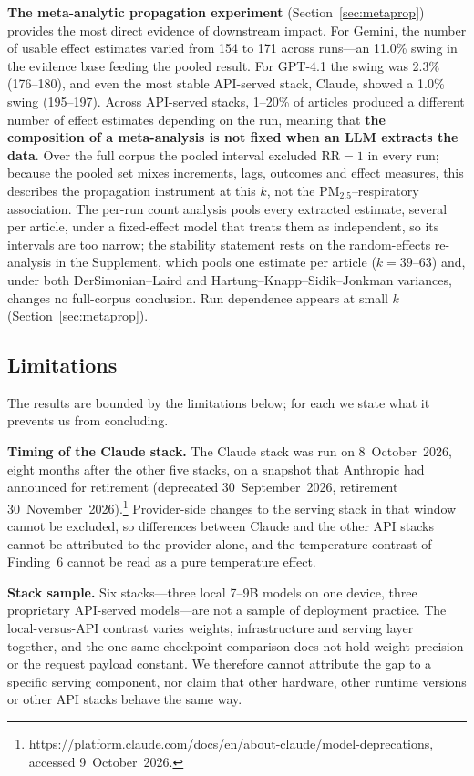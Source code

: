 \documentclass[preprint,review,12pt,authoryear]{elsarticle}
\begin{document}
\textbf{The meta-analytic propagation experiment} (Section~\ref{sec:metaprop}) provides the most direct evidence of downstream impact.
For Gemini, the number of usable effect estimates varied from 154 to 171 across runs---an 11.0\% swing in the evidence base feeding the pooled result.
For GPT-4.1 the swing was 2.3\% (176--180), and even the most stable API-served stack, Claude, showed a 1.0\% swing (195--197).
Across API-served stacks, 1--20\% of articles produced a different number of effect estimates depending on the run, meaning that \textbf{the composition of a meta-analysis is not fixed when an LLM extracts the data}.
Over the full corpus the pooled interval excluded RR${=}1$ in every run; because the pooled set mixes increments, lags, outcomes and effect measures, this describes the propagation instrument at this $k$, not the PM$_{2.5}$--respiratory association. The per-run count analysis pools every extracted estimate, several per article, under a fixed-effect model that treats them as independent, so its intervals are too narrow; the stability statement rests on the random-effects re-analysis in the Supplement, which pools one estimate per article ($k{=}39$--63) and, under both DerSimonian--Laird and Hartung--Knapp--Sidik--Jonkman variances, changes no full-corpus conclusion. Run dependence appears at small $k$ (Section~\ref{sec:metaprop}).

\subsection{Limitations}
\label{sec:limitations}

The results are bounded by the limitations below; for each we state what it prevents us from concluding.

\textbf{Timing of the Claude stack.}
The Claude stack was run on 8~October~2026, eight months after the other five stacks, on a snapshot that Anthropic had announced for retirement (deprecated 30~September~2026, retirement 30~November~2026).\footnote{\url{https://platform.claude.com/docs/en/about-claude/model-deprecations}, accessed 9~October~2026.} Provider-side changes to the serving stack in that window cannot be excluded, so differences between Claude and the other API stacks cannot be attributed to the provider alone, and the temperature contrast of Finding~6 cannot be read as a pure temperature effect.

\textbf{Stack sample.}
Six stacks---three local 7--9B models on one device, three proprietary API-served models---are not a sample of deployment practice. The local-versus-API contrast varies weights, infrastructure and serving layer together, and the one same-checkpoint comparison does not hold weight precision or the request payload constant. We therefore cannot attribute the gap to a specific serving component, nor claim that other hardware, other runtime versions or other API stacks behave the same way.
\end{document}

